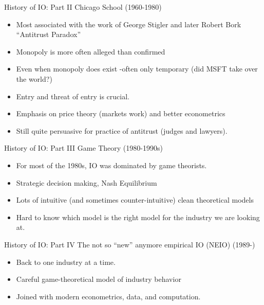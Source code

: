 \documentclass[aspectratio=169,11pt]{beamer}
\begin{document}
\begin{frame}{History of IO: Part II}
Chicago School (1960-1980)
\begin{itemize}
\item Most associated with the work of George Stigler and later Robert Bork ``Antitrust Paradox''
\item Monopoly is more often alleged than confirmed
\item Even when monopoly does exist -often only temporary (did MSFT take over the world?)
\item Entry and threat of entry is crucial.
\item Emphasis on price theory (markets work) and better econometrics
\item Still quite persuasive for practice of antitrust (judges and lawyers).
\end{itemize}
\end{frame}


\begin{frame}{History of IO: Part III}
Game Theory (1980-1990s)
\begin{itemize}
\item For most of the 1980s, IO was dominated by game theorists.
\item Strategic decision making, Nash Equilibrium
\item Lots of intuitive (and sometimes counter-intuitive) clean theoretical models
\item Hard to know which model is the right model for the industry we are looking at.
\end{itemize}
\end{frame}


\begin{frame}{History of IO: Part IV}
The not so ``new'' anymore empirical IO (NEIO) (1989-)
\begin{itemize}
\item Back to one industry at a time.
\item Careful game-theoretical model of industry behavior
\item Joined with modern econometrics, data, and computation.
\end{itemize}
\end{frame}
\end{document}
